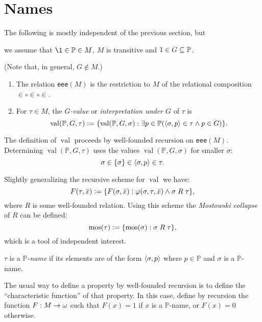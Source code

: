 \documentclass[11pt,english]{article}
\renewcommand{\PP}{\mathbb{P}}
\DeclareMathOperator{\val}{val}
\begin{document}
\section{Names}
\begin{framed}
  The following is mostly independent of the previous section, but %
  \begin{bfseries}%
    we assume that $\1\in\PP\in M$, $M$ is transitive and 
    $1\in G\sbq\PP$.
  \end{bfseries}
  (Note that, in general, $G\notin M$.)
\end{framed}

\begin{definition}
  \begin{enumerate}
  \item The relation \verb|eee|$(M)$ is the restriction to $M$ of the
    relational composition 
    ${\in}\circ{\in}\circ{\in}$. 
  \item For $\tau\in M$, the \emph{$G$-value} or \emph{interpretation
    under $G$} of $\tau$ is
    \[
    \val(\PP,G,\tau)\defi \{\val(\PP,G,\sigma) : \exists p\in \PP
    (\lb\sigma,p\rb\in\tau \y p\in G)\}.
    \]
  \end{enumerate}
\end{definition}

The definition of $\val$ proceeds by well-founded recursion on
\verb|eee|$(M)$. Determining  $\val(\PP,G,\tau)$ uses the values
$\val(\PP,G,\sigma)$ for smaller $\sigma$:
\[
\sigma\in\{\sigma\}\in\langle\sigma,p\rangle\in\tau.
\]

\begin{remark}
  Slightly generalizing the recursive scheme for $\val$ we have:
  \[
  F(\tau,\bar{x})\mathrel{\mathop:}= \{F(\sigma,\bar{x}) : \varphi(\sigma,\tau,\bar{x}) \wedge
  \sigma\mathrel{R}\tau\}, 
  \]
  where $R$ is some well-founded relation. Using this scheme the
  \emph{Mostowski collapse} of $R$ can be defined:
  \[
  \operatorname{mos}(\tau)\mathrel{\mathop:}= \{\operatorname{mos}(\sigma) : \sigma\mathrel{R}\tau\},
  \]
  which is a tool of independent interest.
\end{remark}

\begin{definition}
  $\tau$ is a \emph{$\PP$-name} if its elements are of the form
  $\langle\sigma,p\rangle$ where $p\in\PP$ and $\sigma$ is a $\PP$-name.
\end{definition}
The usual way to define a property by well-founded recursion is to
define the ``characteristic function'' of that property. In this case,
define by recursion the function $F:M\to\omega$ such that $F(x)=1$  if
$x$ is a $\PP$-name, or $F(x)=0$ otherwise.
\end{document}
